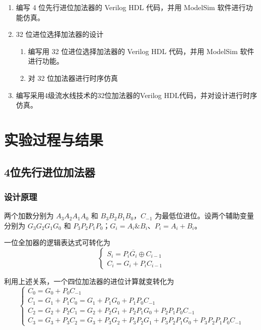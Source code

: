 \documentclass[12pt,a4paper,UTF8]{article}
\begin{document}
\begin{enumerate}
    \item 编写 4 位先行进位加法器的 Verilog HDL 代码，并用 ModelSim 软件进行功能仿真。
    \item 32 位进位选择加法器的设计
    \begin{enumerate}[label=(\arabic*)]
        \item 编写用 32 位进位选择加法器的 Verilog HDL 代码，并用 ModelSim 软件进行功能。
        \item 对 32 位加法器进行时序仿真
    \end{enumerate}
    \item 编写采用4级流水线技术的32位加法器的Verilog HDL代码，并对设计进行时序仿真。
\end{enumerate}

\section{\heiti\bfseries 实验过程与结果}

\subsection{\heiti\bfseries 4位先行进位加法器}

\subsubsection{\heiti\bfseries 设计原理}

两个加数分别为 $A_3A_2A_1A_0$ 和 $B_3B_2B_1B_0$，$C_{-1}$ 为最低位进位。设两个辅助变量分别为 $G_3G_2G_1G_0$ 和 $P_3P_2P_1P_0$；$G_i = A_i \& B_i$、$P_i = A_i + B_i$。

一位全加器的逻辑表达式可转化为
\begin{equation}
\begin{cases}
S_i = P_i \overline{G_i} \oplus C_{i-1} \\
C_i = G_i + P_i C_{i-1}
\end{cases}
\end{equation}

利用上述关系，一个四位加法器的进位计算就变转化为
\begin{equation}
\begin{cases}
C_0 = G_0 + P_0 C_{-1} \\
C_1 = G_1 + P_1 C_0 = G_1 + P_1 G_0 + P_1 P_0 C_{-1} \\
C_2 = G_2 + P_2 C_1 = G_2 + P_2 G_1 + P_2 P_1 G_0 + P_2 P_1 P_0 C_{-1} \\
C_3 = G_3 + P_3 C_2 = G_3 + P_3 G_2 + P_3 P_2 G_1 + P_3 P_2 P_1 G_0 + P_3 P_2 P_1 P_0 C_{-1}
\end{cases}
\end{equation}
\end{document}
